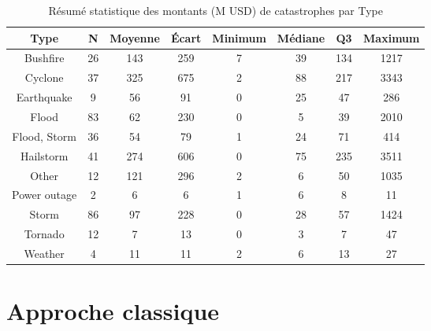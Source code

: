 \begin{table}[ht]
\centering
\begin{tabular}{cccccccc}
  \hline
Type & N & Moyenne & Écart & Minimum & Médiane & Q3 & Maximum \\ 
  \hline
Bushfire & 26 & 143 & 259 & 7 & 39 & 134 & 1217 \\ 
  Cyclone & 37 & 325 & 675 & 2 & 88 & 217 & 3343 \\ 
  Earthquake & 9 & 56 & 91 & 0 & 25 & 47 & 286 \\ 
  Flood & 83 & 62 & 230 & 0 & 5 & 39 & 2010 \\ 
  Flood, Storm & 36 & 54 & 79 & 1 & 24 & 71 & 414 \\ 
  Hailstorm & 41 & 274 & 606 & 0 & 75 & 235 & 3511 \\ 
  Other & 12 & 121 & 296 & 2 & 6 & 50 & 1035 \\ 
  Power outage & 2 & 6 & 6 & 1 & 6 & 8 & 11 \\ 
  Storm & 86 & 97 & 228 & 0 & 28 & 57 & 1424 \\ 
  Tornado & 12 & 7 & 13 & 0 & 3 & 7 & 47 \\ 
  Weather & 4 & 11 & 11 & 2 & 6 & 13 & 27 \\ 
   \hline
\end{tabular}
\caption{Résumé statistique des montants (M USD) de catastrophes par Type} 
\label{tab:3.6}
\end{table}
\clearpage
\section{Approche classique}

